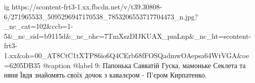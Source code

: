  
 
 
 
 

\ifcmt
  ig https://scontent-frt3-1.xx.fbcdn.net/v/t39.30808-6/271965533_5095296947170538_7853206553717704473_n.jpg?_nc_cat=102&ccb=1-5&_nc_sid=b9115d&_nc_ohc=7TmXszDIJKUAX_pmLnp&_nc_ht=scontent-frt3-1.xx&oh=00_AT8CtC1tXTP86io6Q4CErb68fFOSQadmwOAepsa64WtVGA&oe=6205DB35
  @caption @label 9: Папонька Савватій Гуска, мамоньке Секлета та няня Ївдя знайомять своїх дочок з кавалєром - П'єром Кирпатенко.
\fi
